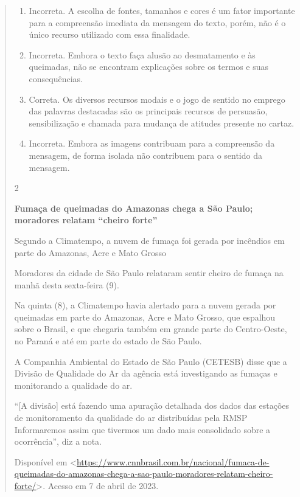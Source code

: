 {\begin{quote}
{\begin{itemize}
\begin{itemize}
\begin{enumerate}
\def\labelenumi{\arabic{enumi}.}
\item
  Incorreta. A escolha de fontes, tamanhos e cores é um fator importante
  para a compreensão imediata da mensagem do texto, porém, não é o único
  recurso utilizado com essa finalidade.
\item
  Incorreta. Embora o texto faça alusão ao desmatamento e às queimadas,
  não se encontram explicações sobre os termos e suas consequências.
\item
  Correta. Os diversos recursos modais e o jogo de sentido no emprego
  das palavras destacadas são os principais recursos de persuasão,
  sensibilização e chamada para mudança de atitudes presente no cartaz.
\item
  Incorreta. Embora as imagens contribuam para a compreensão da
  mensagem, de forma isolada não contribuem para o sentido da mensagem.
\end{enumerate}

\num{2}

\textbf{Fumaça de queimadas do Amazonas chega a São Paulo; moradores
relatam ``cheiro forte''}

Segundo a Climatempo, a nuvem de fumaça foi gerada por incêndios em
parte do Amazonas, Acre e Mato Grosso

Moradores da cidade de São Paulo relataram sentir cheiro de fumaça na
manhã desta sexta-feira (9).

Na quinta (8), a Climatempo havia alertado para a nuvem gerada por
queimadas em parte do Amazonas, Acre e Mato Grosso, que espalhou sobre o
Brasil, e que chegaria também em grande parte do Centro-Oeste, no Paraná
e até em parte do estado de São Paulo.

A Companhia Ambiental do Estado de São Paulo (CETESB) disse que a
Divisão de Qualidade do Ar da agência está investigando as fumaças e
monitorando a qualidade do ar.

``{[}A divisão{]} está fazendo uma apuração detalhada dos dados das
estações de monitoramento da qualidade do ar distribuídas pela RMSP
Informaremos assim que tivermos um dado mais consolidado sobre a
ocorrência'', diz a nota.

Disponível em
\textless{}\href{https://www.cnnbrasil.com.br/nacional/fumaca-de-queimadas-do-amazonas-chega-a-sao-paulo-moradores-relatam-cheiro-forte/}{\uline{https://www.cnnbrasil.com.br/nacional/fumaca-de-queimadas-do-amazonas-chega-a-sao-paulo-moradores-relatam-cheiro-forte/}}\textgreater.
Acesso em 7 de abril de 2023.


\end{itemize}
\end{itemize}}
\end{quote}}

